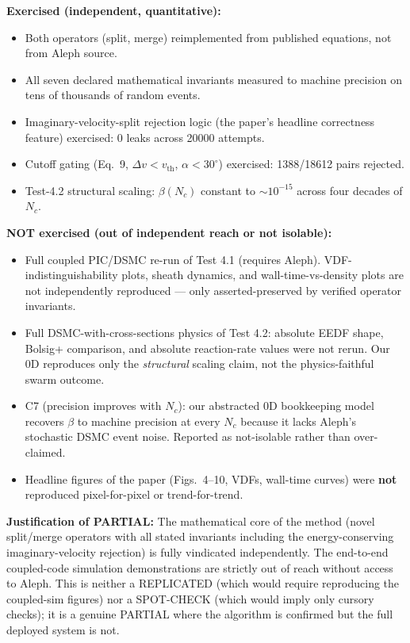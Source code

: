 \documentclass[11pt]{article}
\begin{document}
\textbf{Exercised (independent, quantitative):}
\begin{itemize}
  \item Both operators (split, merge) reimplemented from published equations, not from Aleph source.
  \item All seven declared mathematical invariants measured to machine precision on tens of thousands of random events.
  \item Imaginary-velocity-split rejection logic (the paper's headline correctness feature) exercised: 0 leaks across 20000 attempts.
  \item Cutoff gating (Eq.~9, $\Delta v < v_{\mathrm{th}}$, $\alpha < 30^\circ$) exercised: 1388/18612 pairs rejected.
  \item Test-4.2 structural scaling: $\beta(N_c)$ constant to $\sim10^{-15}$ across four decades of $N_c$.
\end{itemize}

\textbf{NOT exercised (out of independent reach or not isolable):}
\begin{itemize}
  \item Full coupled PIC/DSMC re-run of Test 4.1 (requires Aleph). VDF-indistinguishability plots, sheath dynamics, and wall-time-vs-density plots are not independently reproduced --- only asserted-preserved by verified operator invariants.
  \item Full DSMC-with-cross-sections physics of Test 4.2: absolute EEDF shape, Bolsig+ comparison, and absolute reaction-rate values were not rerun. Our 0D reproduces only the \emph{structural} scaling claim, not the physics-faithful swarm outcome.
  \item C7 (precision improves with $N_c$): our abstracted 0D bookkeeping model recovers $\beta$ to machine precision at every $N_c$ because it lacks Aleph's stochastic DSMC event noise. Reported as not-isolable rather than over-claimed.
  \item Headline figures of the paper (Figs.~4--10, VDFs, wall-time curves) were \textbf{not} reproduced pixel-for-pixel or trend-for-trend.
\end{itemize}

\textbf{Justification of PARTIAL:} The mathematical core of the method (novel split/merge operators with all stated invariants including the energy-conserving imaginary-velocity rejection) is fully vindicated independently. The end-to-end coupled-code simulation demonstrations are strictly out of reach without access to Aleph. This is neither a REPLICATED (which would require reproducing the coupled-sim figures) nor a SPOT-CHECK (which would imply only cursory checks); it is a genuine PARTIAL where the algorithm is confirmed but the full deployed system is not.
\end{document}
